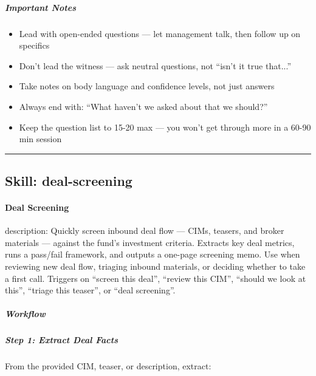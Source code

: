 \documentclass[11pt]{article}
\begin{document}
\subparagraph{Important Notes}\mbox{}\par

\begin{itemize}[leftmargin=*,itemsep=2pt,topsep=2pt]
\item {} Lead with open-ended questions — let management talk, then follow up on specifics
\item {} Don't lead the witness — ask neutral questions, not ``isn't it true that...''
\item {} Take notes on body language and confidence levels, not just answers
\item {} Always end with: ``What haven't we asked about that we should?''
\item {} Keep the question list to 15-20 max — you won't get through more in a 60-90 min session
\end{itemize}

\vspace{0.8em}\hrule\vspace{0.8em}

\subsection{Skill: deal-screening}\label{file:skills-deal-screening-SKILL.md}

\paragraph{Deal Screening}\mbox{}\par

description: Quickly screen inbound deal flow — CIMs, teasers, and broker materials — against the fund's investment criteria. Extracts key deal metrics, runs a pass/fail framework, and outputs a one-page screening memo. Use when reviewing new deal flow, triaging inbound materials, or deciding whether to take a first call. Triggers on ``screen this deal'', ``review this CIM'', ``should we look at this'', ``triage this teaser'', or ``deal screening''.


\subparagraph{Workflow}\mbox{}\par

\subparagraph{Step 1: Extract Deal Facts}\mbox{}\par

From the provided CIM, teaser, or description, extract:
\end{document}
